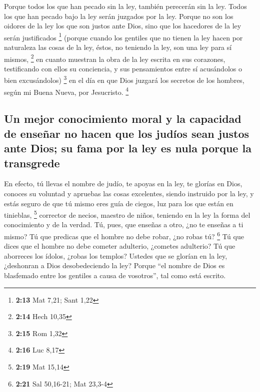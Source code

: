  Porque todos los que han pecado sin la ley, también
perecerán sin la ley. Todos los que han pecado bajo la ley serán
juzgados por la ley.  Porque no son los oidores de la ley
los que son justos ante Dios, sino que los hacedores de la ley serán
justificados \footnote{\textbf{2:13} Mat 7,21; Sant 1,22}
 (porque cuando los gentiles que no tienen la ley hacen
por naturaleza las cosas de la ley, éstos, no teniendo la ley, son una
ley para sí mismos, \footnote{\textbf{2:14} Hech 10,35} 
en cuanto muestran la obra de la ley escrita en sus corazones,
testificando con ellos su conciencia, y sus pensamientos entre sí
acusándolos o bien excusándolos) \footnote{\textbf{2:15} Rom 1,32}
 en el día en que Dios juzgará los secretos de los
hombres, según mi Buena Nueva, por Jesucristo. \footnote{\textbf{2:16}
  Luc 8,17}

\hypertarget{un-mejor-conocimiento-moral-y-la-capacidad-de-enseuxf1ar-no-hacen-que-los-juduxedos-sean-justos-ante-dios-su-fama-por-la-ley-es-nula-porque-la-transgrede}{%
\subsection{Un mejor conocimiento moral y la capacidad de enseñar no
hacen que los judíos sean justos ante Dios; su fama por la ley es nula
porque la
transgrede}\label{un-mejor-conocimiento-moral-y-la-capacidad-de-enseuxf1ar-no-hacen-que-los-juduxedos-sean-justos-ante-dios-su-fama-por-la-ley-es-nula-porque-la-transgrede}}

 En efecto, tú llevas el nombre de judío, te apoyas en la
ley, te glorías en Dios,  conoces su voluntad y apruebas
las cosas excelentes, siendo instruido por la ley,  y
estás seguro de que tú mismo eres guía de ciegos, luz para los que están
en tinieblas, \footnote{\textbf{2:19} Mat 15,14} 
corrector de necios, maestro de niños, teniendo en la ley la forma del
conocimiento y de la verdad.  Tú, pues, que enseñas a
otro, ¿no te enseñas a ti mismo? Tú que predicas que el hombre no debe
robar, ¿no robas tú? \footnote{\textbf{2:21} Sal 50,16-21; Mat 23,3-4}
 Tú que dices que el hombre no debe cometer adulterio,
¿cometes adulterio? Tú que aborreces los ídolos, ¿robas los templos?
 Ustedes que se glorían en la ley, ¿deshonran a Dios
desobedeciendo la ley?  Porque ``el nombre de Dios es
blasfemado entre los gentiles a causa de vosotros'', tal como está
escrito.

